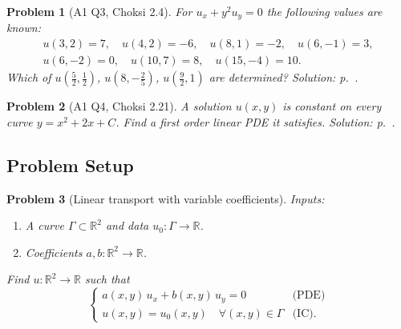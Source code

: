 \documentclass{article}
\newtheorem{problem}{Problem}
\newcommand{\R}{\mathbb{R}}
\begin{document}
\begin{problem}[A1 Q3, Choksi 2.4]\label{prob:a1-24}
    For $u_x + y^2u_y = 0$ the following values are known:
    \begin{gather*}
        u(3,2) = 7,\quad u(4,2) = -6,\quad u(8,1) = -2,\quad u(6,-1) = 3, \\
        u(6,-2) = 0,\quad u(10,7) = 8,\quad u(15,-4) = 10.
    \end{gather*}
    Which of $u(\tfrac52,\tfrac12)$, $u(8,-\tfrac25)$, $u(\tfrac92,1)$ are determined?
    \hfill \emph{Solution: p.~\pageref{sol:a1-24}.}
\end{problem}
\begin{problem}[A1 Q4, Choksi 2.21]\label{prob:a1-221}
    A solution $u(x,y)$ is constant on every curve $y = x^2 + 2x + C$. Find a first order linear PDE it satisfies.
    \hfill \emph{Solution: p.~\pageref{sol:a1-221}.}
\end{problem}

\subsection{Problem Setup}
\begin{problem}[Linear transport with variable coefficients]
    Inputs:
    \begin{enumerate}[label=(\arabic*)]
        \item A curve $\Gamma \subset \mathbb{R}^2$ and data $u_0 : \Gamma \to \R$.
        \item Coefficients $a, b : \R^2 \to \R$.
    \end{enumerate}
    Find $u : \R^2 \to \R$ such that
    \begin{equation}
        \begin{cases}
            a(x,y)\,u_x + b(x,y)\,u_y = 0 & \text{(PDE)} \\
            u(x,y) = u_0(x,y) \quad \forall (x,y) \in \Gamma & \text{(IC)}.
        \end{cases}
    \end{equation}
\end{problem}
\end{document}
